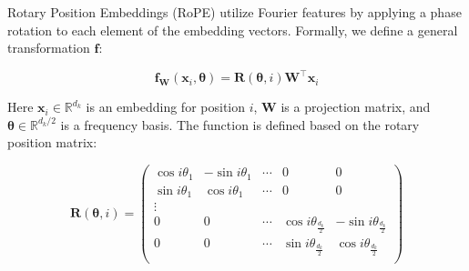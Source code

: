 \documentclass{article}
\begin{document}
Rotary Position Embeddings (RoPE) \citep{su2024roformer} utilize Fourier features by applying a phase rotation to each element of the embedding vectors. Formally, we define a general transformation $\mathbf{f}$:


\begin{equation}
\mathbf{f}_\mathbf{W}(\mathbf{x}_i, \bm{\theta}) = \mathbf{R}(\bm{\theta}, i)\mathbf{W}^\top \mathbf{x}_i
\end{equation}

Here $\mathbf{x}_i \in \mathbb{R}^{d_k}$ is an embedding for position $i$, $\mathbf{W}$ is a projection matrix, and $\bm{\theta} \in \mathbb{R}^{d_k / 2}$ is a frequency basis. The function is defined based on the rotary position matrix: 

\begin{equation}
\mathbf{R}(\bm{\theta},i)= \begin{pmatrix}
\cos i\theta_1 & - \sin i\theta_1 &  \cdots & 0 & 0 \\
\sin i\theta_1 & \cos i\theta_1 & \cdots & 0 & 0 \\
\vdots \\ 
0 & 0 &  \cdots & \cos i\theta_\frac{d_k}{2}  & - \sin i\theta_\frac{d_k}{2}  \\
0 & 0 &  \cdots & \sin i\theta_\frac{d_k}{2}  & \cos i\theta_\frac{d_k}{2}  \\
\end{pmatrix}
\end{equation}





 

\end{document}
